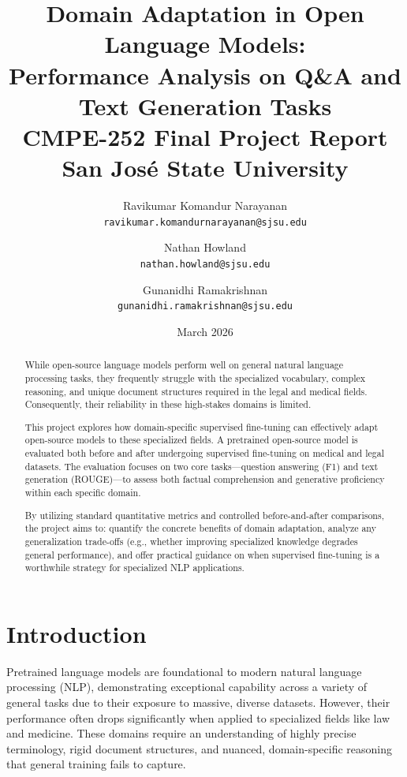 \documentclass[12pt, letterpaper]{article}
\title{
    \textbf{Domain Adaptation in Open Language Models:\\Performance Analysis on Q\&A and Text Generation Tasks}\\[1em]
    \large CMPE-252 Final Project Report\\
    San Jos\'{e} State University
}
\author{
    Ravikumar Komandur Narayanan \\
    \texttt{ravikumar.komandurnarayanan@sjsu.edu}
    \and
    Nathan Howland \\
    \texttt{nathan.howland@sjsu.edu}
    \and
    Gunanidhi Ramakrishnan \\
    \texttt{gunanidhi.ramakrishnan@sjsu.edu}
}
\date{March 2026}
\begin{document}
\maketitle

\begin{abstract}
While open-source language models perform well on general natural language processing tasks, they frequently struggle with the specialized vocabulary, complex reasoning, and unique document structures required in the legal and medical fields. Consequently, their reliability in these high-stakes domains is limited.

This project explores how domain-specific supervised fine-tuning can effectively adapt open-source models to these specialized fields. A pretrained open-source model is evaluated both before and after undergoing supervised fine-tuning on medical and legal datasets. The evaluation focuses on two core tasks---question answering (F1) and text generation (ROUGE)---to assess both factual comprehension and generative proficiency within each specific domain.

By utilizing standard quantitative metrics and controlled before-and-after comparisons, the project aims to: quantify the concrete benefits of domain adaptation, analyze any generalization trade-offs (e.g., whether improving specialized knowledge degrades general performance), and offer practical guidance on when supervised fine-tuning is a worthwhile strategy for specialized NLP applications.
\end{abstract}

\newpage
\tableofcontents
\newpage

\section{Introduction}
\label{sec:introduction}

Pretrained language models are foundational to modern natural language processing (NLP), demonstrating exceptional capability across a variety of general tasks due to their exposure to massive, diverse datasets. However, their performance often drops significantly when applied to specialized fields like law and medicine. These domains require an understanding of highly precise terminology, rigid document structures, and nuanced, domain-specific reasoning that general training fails to capture.
\end{document}
